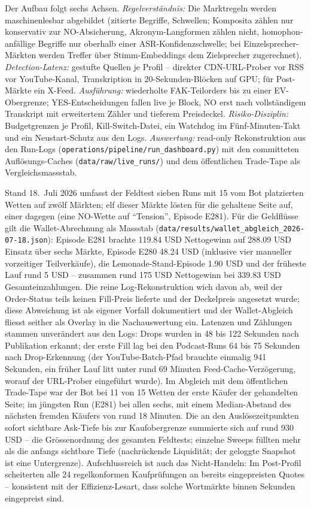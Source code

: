 Der Aufbau folgt sechs Achsen. \emph{Regelverständnis:} Die Marktregeln werden
maschinenlesbar abgebildet (zitierte Begriffe, Schwellen; Komposita zählen nur
konservativ zur NO-Absicherung, Akronym-Langformen zählen nicht, homophon-anfällige
Begriffe nur oberhalb einer ASR-Konfidenzschwelle; bei Einzelsprecher-Märkten
werden Treffer über Stimm-Embeddings dem Zielsprecher zugerechnet).
\emph{Detection-Latenz:} gestufte Quellen je Profil -- direkter CDN-URL-Prober vor
RSS vor YouTube-Kanal, Transkription in 20-Sekunden-Blöcken auf GPU; für
Post-Märkte ein X-Feed. \emph{Ausführung:} wiederholte FAK-Teilorders bis zu einer
EV-Obergrenze; YES-Entscheidungen fallen live je Block, NO erst nach vollständigem
Transkript mit erweitertem Zähler und tieferem Preisdeckel. \emph{Risiko-Disziplin:}
Budgetgrenzen je Profil, Kill-Switch-Datei, ein Watchdog im Fünf-Minuten-Takt und
ein Neustart-Schutz aus den Logs. \emph{Auswertung:} read-only Rekonstruktion aus
den Run-Logs (\texttt{operations/pipeline/run\_dashboard.py}) mit den committeten
Auflösungs-Caches (\texttt{data/raw/live\_runs/}) und dem öffentlichen Trade-Tape
als Vergleichsmassstab.

Stand 18.~Juli 2026 umfasst der Feldtest sieben Runs mit 15 vom Bot platzierten
Wetten auf zwölf Märkten; elf dieser Märkte lösten für die gehaltene Seite auf,
einer dagegen (eine NO-Wette auf \enquote{Tension}, Episode E281). Für die
Geldflüsse gilt die Wallet-Abrechnung als Massstab
(\texttt{data/results/wallet\_abgleich\_2026-07-18.json}): Episode E281 brachte
119.84 USD Nettogewinn auf 288.09 USD Einsatz über sechs Märkte, Episode E280
48.24 USD (inklusive vier manueller vorzeitiger Teilverkäufe), die
Lemonade-Stand-Episode 1.90 USD und der früheste Lauf rund 5 USD -- zusammen
rund 175 USD Nettogewinn bei 339.83 USD Gesamteinzahlungen. Die reine
Log-Rekonstruktion wich davon ab, weil der Order-Status teils keinen Fill-Preis
lieferte und der Deckelpreis angesetzt wurde; diese Abweichung ist als eigener
Vorfall dokumentiert und der Wallet-Abgleich fliesst seither als Overlay in die
Nachauswertung ein. Latenzen und Zählungen stammen unverändert aus den Logs:
Drops wurden in 48 bis 122 Sekunden nach Publikation erkannt; der erste Fill lag
bei den Podcast-Runs 64 bis 75 Sekunden nach Drop-Erkennung (der
YouTube-Batch-Pfad brauchte einmalig 941 Sekunden, ein früher Lauf litt unter
rund 69 Minuten Feed-Cache-Verzögerung, worauf der URL-Prober eingeführt wurde).
Im Abgleich mit dem öffentlichen Trade-Tape war der Bot bei 11 von 15 Wetten der
erste Käufer der gehandelten Seite; im jüngsten Run (E281) bei allen sechs, mit
einem Median-Abstand des nächsten fremden Käufers von rund 18 Minuten. Die an
den Auslösezeitpunkten sofort sichtbare Ask-Tiefe bis zur Kaufobergrenze
summierte sich auf rund 930 USD -- die Grössenordnung des gesamten Feldtests;
einzelne Sweeps füllten mehr als die anfangs sichtbare Tiefe (nachrückende
Liquidität; der geloggte Snapshot ist eine Untergrenze). Aufschlussreich ist
auch das Nicht-Handeln: Im Post-Profil scheiterten alle 24 regelkonformen
Kaufprüfungen an bereits eingepreisten Quotes -- konsistent mit der
Effizienz-Lesart, dass solche Wortmärkte binnen Sekunden eingepreist sind.

